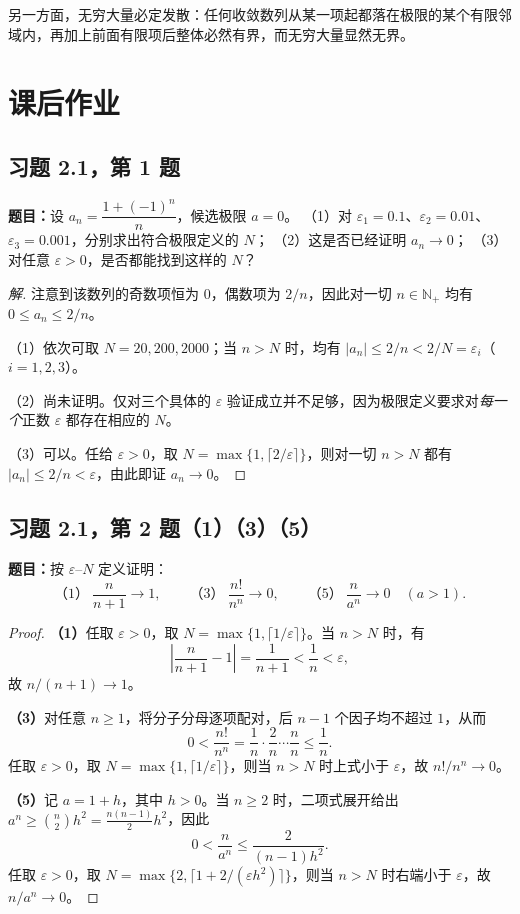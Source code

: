 \documentclass[UTF8, fontset=fandol, a4paper, 12pt]{ctexart}
\newcommand{\Nplus}{\mathbb N_{+}}
\theoremstyle{definition}
\begin{document}
另一方面，无穷大量必定发散：任何收敛数列从某一项起都落在极限的某个有限邻域内，再加上前面有限项后整体必然有界，而无穷大量显然无界。

\section{课后作业}
\subsection{习题 2.1，第 1 题}
\noindent\textbf{题目：}设
$a_n=\dfrac{1+(-1)^n}{n}$，候选极限 $a=0$。
（1）对 $\varepsilon_1=0.1$、$\varepsilon_2=0.01$、
$\varepsilon_3=0.001$，分别求出符合极限定义的 $N$；
（2）这是否已经证明 $a_n\to0$；
（3）对任意 $\varepsilon>0$，是否都能找到这样的 $N$？

\begin{proof}[解]
注意到该数列的奇数项恒为 $0$，偶数项为 $2/n$，因此对一切 $n\in\Nplus$ 均有 $0\le a_n\le2/n$。

（1）依次可取 $N=20,200,2000$；当 $n>N$ 时，均有 $|a_n|\le 2/n<2/N=\varepsilon_i$（$i=1,2,3$）。

（2）尚未证明。仅对三个具体的 $\varepsilon$ 验证成立并不足够，因为极限定义要求对\emph{每一个}正数 $\varepsilon$ 都存在相应的 $N$。

（3）可以。任给 $\varepsilon>0$，取 $N=\max\{1,\lceil2/\varepsilon\rceil\}$，则对一切 $n>N$ 都有 $|a_n|\le2/n<\varepsilon$，由此即证 $a_n\to0$。
\end{proof}

\subsection{习题 2.1，第 2 题（1）（3）（5）}
\noindent\textbf{题目：}按 $\varepsilon$--$N$ 定义证明：
\[
 \text{（1）}\ \frac{n}{n+1}\to1,\qquad
 \text{（3）}\ \frac{n!}{n^n}\to0,\qquad
 \text{（5）}\ \frac{n}{a^n}\to0\quad(a>1).
\]
\begin{proof}
\textbf{（1）}任取 $\varepsilon>0$，取 $N=\max\{1,\lceil1/\varepsilon\rceil\}$。当 $n>N$ 时，有
\[
 \left|\frac{n}{n+1}-1\right|=\frac1{n+1}
 <\frac1n<\varepsilon,
\]
故 $n/(n+1)\to1$。

\medskip
\textbf{（3）}对任意 $n\ge1$，将分子分母逐项配对，后 $n-1$ 个因子均不超过 $1$，从而
\[
 0<\frac{n!}{n^n}
 =\frac1n\cdot\frac2n\cdots\frac nn\le\frac1n.
\]
任取 $\varepsilon>0$，取 $N=\max\{1,\lceil1/\varepsilon\rceil\}$，则当 $n>N$ 时上式小于 $\varepsilon$，故 $n!/n^n\to0$。

\medskip
\textbf{（5）}记 $a=1+h$，其中 $h>0$。当 $n\ge2$ 时，二项式展开给出 $a^n\ge\binom n2 h^2=\frac{n(n-1)}{2}h^2$，因此
\[
 0<\frac n{a^n}\le\frac{2}{(n-1)h^2}.
\]
任取 $\varepsilon>0$，取 $N=\max\{2,\lceil1+2/(\varepsilon h^2)\rceil\}$，则当 $n>N$ 时右端小于 $\varepsilon$，故 $n/a^n\to0$。
\end{proof}
\end{document}
